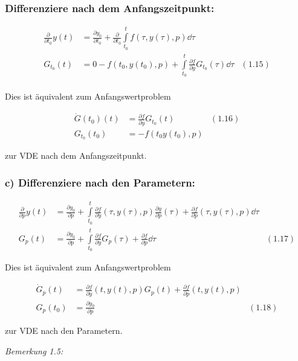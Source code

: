 \subsubsection*{Differenziere nach dem Anfangszeitpunkt:}

\begin{align*}
\frac{\partial}{\partial t_0} y(t) &= \frac{\partial y_0}{\partial t_0} + \frac{\partial}{\partial t_0} \int\limits_{t_0}^t f(\tau, y(\tau),p) \dd \tau \\
G_{t_0} (t) &= 0 - f(t_0, y(t_0), p) + \int\limits_{t_0}^t \frac{\partial f}{\partial y} G_{t_0} (\tau) \dd \tau & (1.15) \\
\end{align*}

Dies ist äquivalent zum Anfangswertproblem

\begin{align*}
\dot G(t_0) (t) &= \frac{\partial f}{\partial y} G_{t_0} (t) & (1.16) \\
G_{t_0} (t_0) &= -f(t_0 y(t_0), p) 
\end{align*}

zur VDE nach dem Anfangszeitpunkt.

\subsubsection*{c) Differenziere nach den Parametern:}

\begin{align*}
\frac \partial{\partial p} y(t) &= \frac{\partial y_0}{\partial p} + \int\limits_{t_0}^t \frac{\partial f}{\partial y} (\tau, y(\tau), p) \frac{\partial y}{\partial p} (\tau) + \frac{\partial f}{\partial p} (\tau, y(\tau), p) \dd \tau \\
G_p(t) &= \frac{\partial y_0}{\partial p} + \int\limits_{t_0}^t \frac{\partial f}{\partial y} G_p(\tau) + \frac{\partial f}{\partial p} \dd \tau & (1.17)
\end{align*}

Dies ist äquivalent zum Anfangswertproblem

\begin{align*}
\dot G_p(t) &= \frac{\partial f}{\partial y} (t,y(t),p) G_p(t) + \frac{\partial f}{\partial p} (t, y(t), p) \\
G_p(t_0) &= \frac{\partial y_0}{\partial p} & (1.18)
\end{align*}

zur VDE nach den Parametern.

\emph{Bemerkung 1.5:}

